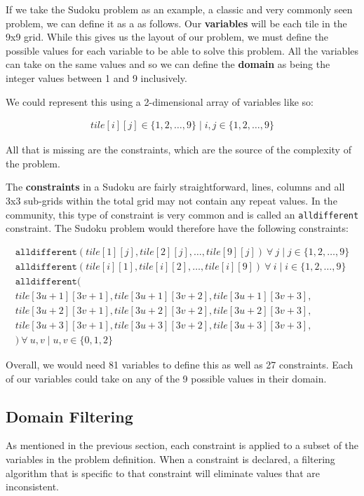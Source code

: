 \documentclass[../Document.tex]{subfiles}
\begin{document}
If we take the Sudoku problem as an example, a classic and very commonly seen problem, we can define it as a \csp as follows.
Our \textbf{variables} will be each tile in the 9x9 grid. While this gives us the layout of our problem, we must define the possible values for each variable to be able to solve this problem.
All the variables can take on the same values and so we can define the \textbf{domain} as being the integer values between 1 and 9 inclusively. 

We could represent this using a 2-dimensional array of variables like so:

\begin{align}
    tile[i][j] \in \{1,2,\dots,9\} \mid i,j \in \{1,2,\dots,9\}
\end{align}

All that is missing are the constraints, which are the source of the complexity of the problem.

The \textbf{constraints} in a Sudoku are fairly straightforward, lines, columns and all 3x3 sub-grids within the total grid may not contain any repeat values.
In the \cp community, this type of constraint is very common and is called an \texttt{alldifferent} constraint. The Sudoku problem would therefore have the following constraints:

\begin{gather*}
    \texttt{alldifferent}(tile[1][j], tile[2][j], \dots, tile[9][j])\ \forall\ j \mid j \in \{1,2,\dots,9\} \\
    \texttt{alldifferent}(tile[i][1], tile[i][2], \dots, tile[i][9])\ \forall\ i \mid i \in \{1,2,\dots,9\} \\
    \texttt{alldifferent}(\\
        tile[3u+1][3v+1],tile[3u+1][3v+2],tile[3u+1][3v+3],\\
        tile[3u+2][3v+1],tile[3u+2][3v+2],tile[3u+2][3v+3],\\
        tile[3u+3][3v+1],tile[3u+3][3v+2],tile[3u+3][3v+3],\\
    )\ \forall\ u,v \mid u,v \in \{0,1,2\}
\end{gather*}

Overall, we would need 81 variables to define this \csp as well as 27 constraints. Each of our variables could take on any of the 9 possible values in their domain.

\subsection{Domain Filtering}
As mentioned in the previous section, each constraint is applied to a subset of the variables in the problem definition. When a constraint is declared, a filtering algorithm that is specific to that constraint will eliminate values that are inconsistent.
\end{document}

